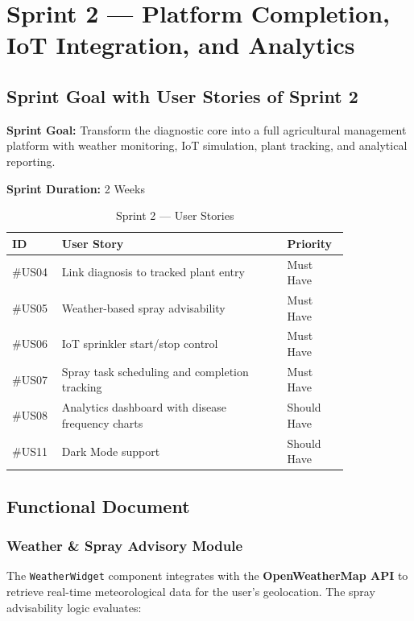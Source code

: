 \documentclass[12pt,a4paper]{report}
\begin{document}
\newpage

\section{Sprint 2 --- Platform Completion, IoT Integration, and Analytics}

\subsection{Sprint Goal with User Stories of Sprint 2}
\textbf{Sprint Goal:} Transform the diagnostic core into a full agricultural management platform with weather monitoring, IoT simulation, plant tracking, and analytical reporting.

\textbf{Sprint Duration:} 2 Weeks

\begin{table}[H]
\centering
\caption{Sprint 2 — User Stories}
\begin{tabular}{p{0.08\linewidth} p{0.60\linewidth} p{0.15\linewidth}}
\toprule
\textbf{ID} & \textbf{User Story} & \textbf{Priority} \\
\midrule
\#US04 & Link diagnosis to tracked plant entry & Must Have \\
\#US05 & Weather-based spray advisability & Must Have \\
\#US06 & IoT sprinkler start/stop control & Must Have \\
\#US07 & Spray task scheduling and completion tracking & Must Have \\
\#US08 & Analytics dashboard with disease frequency charts & Should Have \\
\#US11 & Dark Mode support & Should Have \\
\bottomrule
\end{tabular}
\end{table}

\subsection{Functional Document}

\subsubsection{Weather \& Spray Advisory Module}
The \texttt{WeatherWidget} component integrates with the \textbf{OpenWeatherMap API} to retrieve real-time meteorological data for the user's geolocation. The spray advisability logic evaluates:
\end{document}
